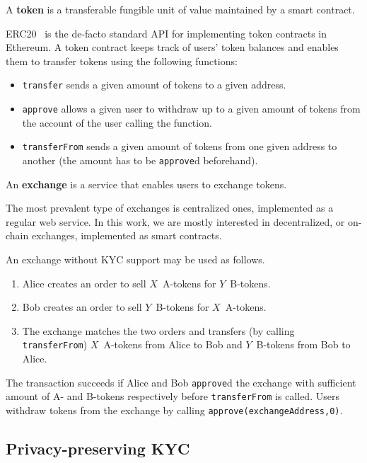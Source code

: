 \begin{definition}
	A \textbf{token} is a transferable fungible unit of value maintained by a smart contract.
\end{definition}

ERC20~\cite{Victor2019} is the de-facto standard API for implementing token contracts in Ethereum.
A token contract keeps track of users' token balances and enables them to transfer tokens using the following functions:

\begin{itemize}
	\item \texttt{transfer} sends a given amount of tokens to a given address.
	\item \texttt{approve} allows a given user to withdraw up to a given amount of tokens from the account of the user calling the function.
	\item \texttt{transferFrom} sends a given amount of tokens from one given address to another (the amount has to be \texttt{approve}d beforehand).
\end{itemize}

\begin{definition}
	An \textbf{exchange} is a service that enables users to exchange tokens.
\end{definition}

The most prevalent type of exchanges is centralized ones, implemented as a regular web service.
In this work, we are mostly interested in decentralized, or on-chain exchanges, implemented as smart contracts. 

An exchange without KYC support may be used as follows.
\begin{enumerate}
	\item Alice creates an order to sell $X$~A-tokens for $Y$~B-tokens.
	\item Bob creates an order to sell $Y$~B-tokens for $X$~A-tokens.
	\item The exchange matches the two orders and transfers (by calling \texttt{transferFrom}) $X$~A-tokens from Alice to Bob and $Y$~B-tokens from Bob to Alice.
\end{enumerate}

The transaction succeeds if Alice and Bob \texttt{approve}d the exchange with sufficient amount of A- and B-tokens respectively before \texttt{transferFrom} is called.
Users withdraw tokens from the exchange by calling \texttt{approve(exchangeAddress,0)}.



\subsection{Privacy-preserving KYC}
\label{sec:PrivacyPreservingKYC}

